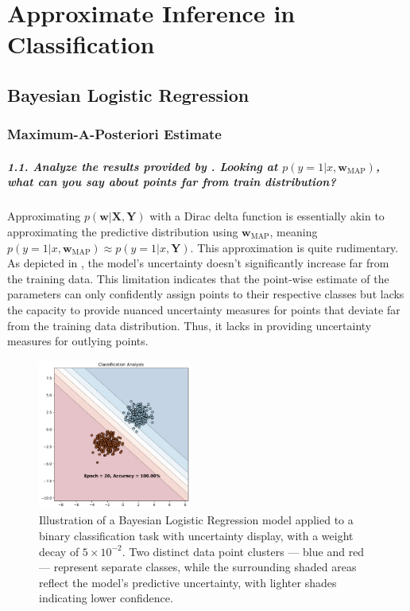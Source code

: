 \graphicspath{{figs/3b}}

\chapter{Approximate Inference in Classification}
\section{Bayesian Logistic Regression}
\subsection{Maximum-A-Posteriori Estimate}
\paragraph{1.1. Analyze the results provided by . Looking at $p(y=1 | x, \mathbf{w}_{\textrm{MAP}})$, what can you say about points far from train distribution?}

Approximating $p(\mathbf{w} | \mathbf{X}, \mathbf{Y})$ with a Dirac delta function is essentially akin to approximating the predictive distribution using $\mathbf{w}_{\textrm{MAP}}$, meaning $p(y=1 | x, \mathbf{w}_{\textrm{MAP}}) \approx p(y=1 | x, \mathbf{Y})$. This approximation is quite rudimentary. As depicted in , the model's uncertainty doesn't significantly increase far from the training data. This limitation indicates that the point-wise estimate of the parameters can only confidently assign points to their respective classes but lacks the capacity to provide nuanced uncertainty measures for points that deviate far from the training data distribution. Thus, it lacks in providing uncertainty measures for outlying points.


\begin{figure}[H]
    \centering
    \includegraphics[width=0.45\textwidth]{logreg_map.pdf}
    \caption{Illustration of a Bayesian Logistic Regression model applied to a binary classification task with uncertainty display, with a weight decay of $5 \times 10^{-2}$. Two distinct data point clusters — blue and red — represent separate classes, while the surrounding shaded areas reflect the model's predictive uncertainty, with lighter shades indicating lower confidence.}
    \label{fig:logreg_map}
\end{figure}

